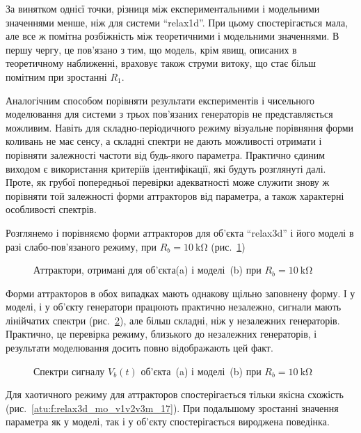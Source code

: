 За винятком однієї точки, різниця між експериментальними
і модельними значеннями менше, ніж для системи ``relax1d''. При
цьому спостерігається мала, але все ж помітна розбіжність між
теоретичними і модельними значеннями. В першу чергу, це пов'язано
з тим, що модель, крім явищ, описаних в теоретичному наближенні,
враховує також струми витоку, що стає більш помітним при
зростанні $R_1$.

Аналогічним способом порівняти результати експериментів
і чисельного моделювання для системи з трьох пов'язаних
генераторів не представляється можливим. Навіть для
складно-періодичного режиму візуальне порівняння форми
коливань не має сенсу, а складні спектри не дають можливості
отримати і порівняти залежності частоти від будь-якого
параметра. Практично єдиним виходом є використання критеріїв
ідентифікації, які будуть розглянуті далі. Проте, як грубої
попередньої перевірки адекватності може служити знову ж
порівняти той залежності форми аттракторов від параметра, а
також характерні особливості спектрів.

Розглянемо і порівняємо форми аттракторов для об'єкта ``relax3d''
і його моделі в разі слабо-пов'язаного режиму, при
$R_b = \SI{10}{\kilo \ohm} $ (рис.~\ref{atu:f:relax3d_mo_v1v2v3m_03})

\begin{figure}[htb!]
  \caption{Аттрактори, отримані для об'єкта(a) і моделі~(b) при $ R_b = \SI{10}{\kilo \ohm} $}
\label{atu:f:relax3d_mo_v1v2v3m_03}
\end{figure}

Форми аттракторов в обох випадках мають однакову щільно
заповнену форму. І у моделі, і у об'єкту генератори працюють
практично незалежно, сигнали мають лінійчатих спектри
(рис.~\ref{atu:f:relax3d_mo_f_03}), але більш складні, ніж у незалежних
генераторів. Практично, це перевірка режиму, близького до
незалежних генераторів, і результати моделювання досить повно
відображають цей факт.


\begin{figure}[htb!]
  \caption{Спектри сигналу $V_b(t)$ об'єкта~(a) і моделі~(b) при $ R_b = \SI{10}{\kilo \ohm} $}
\label{atu:f:relax3d_mo_f_03}
\end{figure}

Для хаотичного режиму для аттракторов спостерігається тільки
якісна схожість (рис.~\ref{atu:f:relax3d_mo_v1v2v3m_17}). При подальшому
зростанні значення параметра як у моделі, так і у об'єкту
спостерігається вироджена поведінка.


